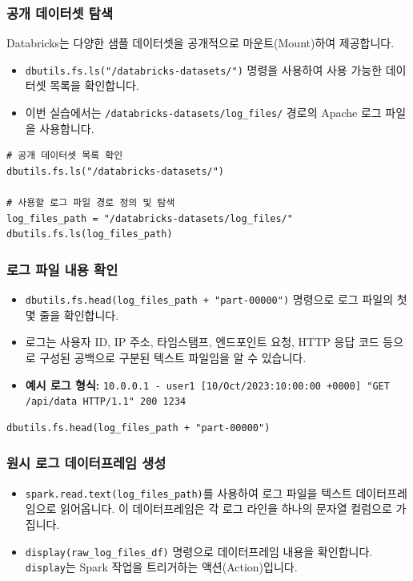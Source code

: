 \documentclass[11pt,a4paper]{article}
\theoremstyle{definition}
\begin{document}
\subsubsection{공개 데이터셋 탐색}
Databricks는 다양한 샘플 데이터셋을 공개적으로 마운트(Mount)하여 제공합니다.
\begin{itemize}
    \item \texttt{dbutils.fs.ls("/databricks-datasets/")} 명령을 사용하여 사용 가능한 데이터셋 목록을 확인합니다.
    \item 이번 실습에서는 \texttt{/databricks-datasets/log_files/} 경로의 Apache 로그 파일을 사용합니다.
\end{itemize}

\begin{lstlisting}[label={lst:explore_datasets}]
# 공개 데이터셋 목록 확인
dbutils.fs.ls("/databricks-datasets/")

# 사용할 로그 파일 경로 정의 및 탐색
log_files_path = "/databricks-datasets/log_files/"
dbutils.fs.ls(log_files_path)
\end{lstlisting}

\subsubsection{로그 파일 내용 확인}
\begin{itemize}
    \item \texttt{dbutils.fs.head(log_files_path + "part-00000")} 명령으로 로그 파일의 첫 몇 줄을 확인합니다.
    \item 로그는 사용자 ID, IP 주소, 타임스탬프, 엔드포인트 요청, HTTP 응답 코드 등으로 구성된 공백으로 구분된 텍스트 파일임을 알 수 있습니다.
    \item \textbf{예시 로그 형식:} \texttt{10.0.0.1 - user1 [10/Oct/2023:10:00:00 +0000] "GET /api/data HTTP/1.1" 200 1234}
\end{itemize}

\begin{lstlisting}[label={lst:head_log_file}]
dbutils.fs.head(log_files_path + "part-00000")
\end{lstlisting}

\subsubsection{원시 로그 데이터프레임 생성}
\begin{itemize}
    \item \texttt{spark.read.text(log_files_path)}를 사용하여 로그 파일을 텍스트 데이터프레임으로 읽어옵니다. 이 데이터프레임은 각 로그 라인을 하나의 문자열 컬럼으로 가집니다.
    \item \texttt{display(raw_log_files_df)} 명령으로 데이터프레임 내용을 확인합니다. \texttt{display}는 Spark 작업을 트리거하는 액션(Action)입니다.
\end{itemize}
\end{document}
